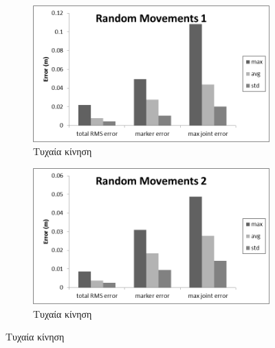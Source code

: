\begin{figure}[H]
    \begin{subfigure}[t]{.48\textwidth}
        \includegraphics[width=\textwidth, keepaspectratio]{fig/ik-reg5.png}
        \caption{Τυχαία κίνηση}
        \label{fig:random-walk1}
    \end{subfigure}
    \begin{subfigure}[t]{.48\textwidth}
        \includegraphics[width=\textwidth, keepaspectratio]{fig/ik-reg4.png}
        \caption{Τυχαία κίνηση}
        \label{fig:random-walk1}
    \end{subfigure}


\end{figure}

